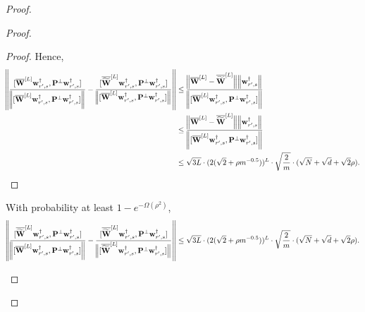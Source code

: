 \begin{claim}
\begin{proof}
\begin{proof}
\begin{proof}
						Hence, 
						\begin{align*}
							\norm{\frac{[\overline{\mathbf{W}}^{[L]} \mathbf{w}_{r', s}^{\dagger}, \mathbf{P}^{\perp}\mathbf{w}_{r', s}^{\dagger}]}{\norm{[\overline{\mathbf{W}}^{[L]} \mathbf{w}_{r', s}^{\dagger}, \mathbf{P}^{\perp}\mathbf{w}_{r', s}^{\dagger}]}} - \frac{[\overline{\widetilde{\mathbf{W}}}^{[L]} \mathbf{w}_{r', s}^{\dagger}, \mathbf{P}^{\perp}\mathbf{w}_{r', s}^{\dagger}]}{\norm[2]{[\overline{\mathbf{W}}^{[L]} \mathbf{w}_{r', s}^{\dagger}, \mathbf{P}^{\perp}\mathbf{w}_{r', s}^{\dagger}]}}} &\le  \frac{\norm[2]{\overline{\mathbf{W}}^{[L]} -  \overline{\widetilde{\mathbf{W}}}^{[L]}} \norm{\mathbf{w}_{r', s}^{\dagger} }}
							{\norm{[\overline{\mathbf{W}}^{[L]} \mathbf{w}_{r', s}^{\dagger}, \mathbf{P}^{\perp}\mathbf{w}_{r', s}^{\dagger}]} } \\
							& \le \frac{\norm[2]{\overline{\mathbf{W}}^{[L]} -  \overline{\widetilde{\mathbf{W}}}^{[L]}} \norm{\mathbf{w}_{r', s}^{\dagger} }}
							{\norm{[\overline{\mathbf{W}}^{[L]} \mathbf{w}_{r', s}^{\dagger}, \mathbf{P}^{\perp}\mathbf{w}_{r', s}^{\dagger}]} } \\&
							\le \sqrt{3L} \cdot (2 (\sqrt{2} + \rho m^{-0.5}))^{L} \cdot \sqrt{\frac{2}{m}} \cdot   (\sqrt{N} + \sqrt{d} + \sqrt{2}\rho).
						\end{align*}
					\end{proof}
					
					
					\begin{claim}\label{claim:stability_barW_2}
						With probability at least $1-e^{-\Omega(\rho^2)}$,
						\begin{equation*}
							\norm{\frac{[\overline{\widetilde{\mathbf{W}}}^{[L]} \mathbf{w}_{r', s}^{\dagger}, \mathbf{P}^{\perp}\mathbf{w}_{r', s}^{\dagger}]}{\norm{[\overline{\mathbf{W}}^{[L]} \mathbf{w}_{r', s}^{\dagger}, \mathbf{P}^{\perp}\mathbf{w}_{r', s}^{\dagger}]}} - \frac{[\overline{\widetilde{\mathbf{W}}}^{[L]} \mathbf{w}_{r', s}^{\dagger}, \mathbf{P}^{\perp}\mathbf{w}_{r', s}^{\dagger}]}{\norm[2]{[\overline{\widetilde{\mathbf{W}}}^{[L]} \mathbf{w}_{r', s}^{\dagger}, \mathbf{P}^{\perp}\mathbf{w}_{r', s}^{\dagger}]}}} \le \sqrt{3L} \cdot (2 (\sqrt{2} + \rho m^{-0.5}))^{L} \cdot \sqrt{\frac{2}{m}} \cdot   (\sqrt{N} + \sqrt{d} + \sqrt{2}\rho).
						\end{equation*}
					\end{claim}
					

\end{proof}
\end{proof}
\end{claim}
